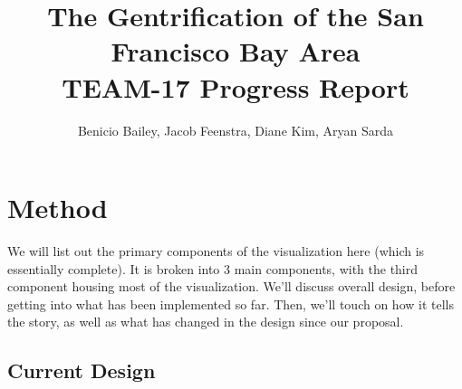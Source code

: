 \documentclass{article}
\title{The Gentrification of the San Francisco Bay Area \\ \large TEAM-17 Progress Report}
\author{Benicio Bailey, Jacob Feenstra, Diane Kim, Aryan Sarda}
\begin{document}
\maketitle

\section{Method}

 We will list out the primary components  of the visualization here (which is essentially complete). It is broken into 3 main components, with the third component housing most of the visualization. We'll discuss overall design, before getting into what has been implemented so far. Then, we'll touch on how it tells the story, as well as what has changed in the design since our proposal.

\subsection{Current Design}
\end{document}

